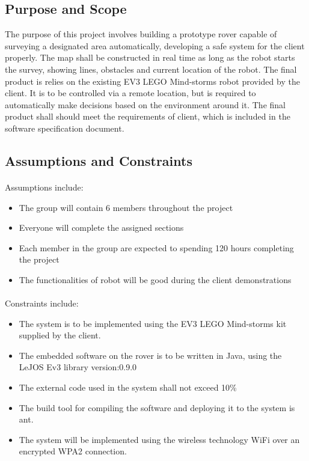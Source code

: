 	\subsection{Purpose and Scope}
The purpose of this project involves building a prototype rover capable of surveying a designated area automatically, developing a safe system for the client properly. The map shall be constructed  in real time as long as the robot starts the survey, showing lines, obstacles and current location of the robot. The final product is relies on the existing EV3 LEGO Mind-storms robot provided by the client. It is to be controlled via a remote location, but is required to automatically make decisions based on the environment around it. The final product shall should meet the requirements of client, which is included in the software specification document.

\subsection{Assumptions and Constraints}
\paragraph{}
Assumptions include:
\begin{itemize}
	\item The group will contain 6 members throughout the project 
	\item Everyone will complete the assigned sections 
	\item Each member in the group are expected to spending 120 hours completing the project
	\item The functionalities of robot will be good during the client demonstrations
	
\end{itemize}
\paragraph{}

Constraints include:
\begin{itemize}
	\item The system is to be implemented using the EV3 LEGO Mind-storms kit supplied by the client.
	\item The embedded software on the rover is to be written in Java, using the LeJOS Ev3 library version:0.9.0
	\item The external code used in the system shall not exceed 10\%
	\item The build tool for compiling the software and deploying it to the system is ant. 
	\item The system will be implemented using the wireless technology WiFi over an encrypted WPA2 connection.
\end{itemize}


